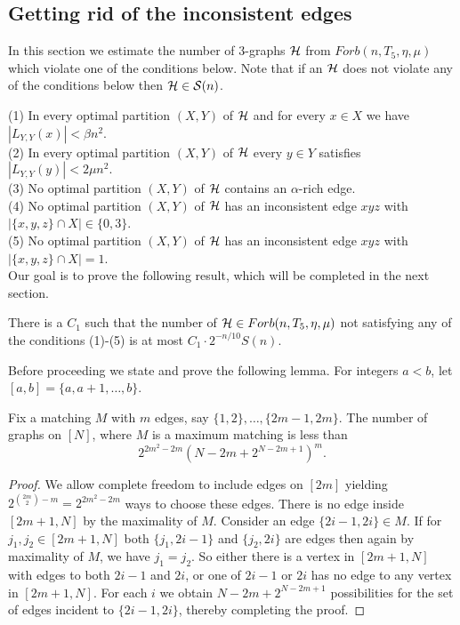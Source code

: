 \documentclass[11pt]{article}
\begin{document}
\subsection{Getting rid of the inconsistent edges}\label{secinconedges}



In this section  we estimate the number of $3$-graphs $\mathcal{H}$ from
$Forb(n,T_5,\eta,\mu)$ which violate one of the conditions below.
Note that if an $\mathcal{H}$ does not violate any of the conditions below
then $\mathcal{H}\in \mathcal{S}(n)$.


(1) In every optimal partition  $(X,Y)$ of $\mathcal{H}$ and for every
$x\in X$ we have $|L_{Y,Y}(x)|< \beta n^2$.\\
(2)  In every optimal partition  $(X,Y)$ of $\mathcal{H}$ every $y\in Y$
satisfies $|L_{Y,Y}(y)|<2\mu n^2.$   \\
 (3) No  optimal partition  $(X,Y)$ of $\mathcal{H}$ contains an $\alpha$-rich
edge.\\
(4) No optimal partition $(X,Y)$ of $\mathcal{H}$ has an inconsistent edge
 $xyz$ with $|\{x,y,z\} \cap X|\in\{0,3\}$.\\
(5) No optimal partition $(X,Y)$ of $\mathcal{H}$ has an inconsistent edge
 $xyz$ with $|\{x,y,z\} \cap X|=1$.
\\

Our goal is to prove the following result, which will be completed in the next section.

\begin{theorem}\label{badtriple}
There is a $C_1$ such that the number of $\mathcal{H}\in
 Forb(n,T_5,\eta,\mu)$ not satisfying any of the conditions (1)-(5) is at most  $C_1\cdot
 2^{-n/10}S(n)$.
\end{theorem}

Before proceeding we state and prove the following lemma.
For integers $a<b$, let $[a,b]=\{a, a+1, \ldots, b\}$.

\begin{lemma}\label{matchcount}
Fix a matching $M$ with $m$ edges, say $\{1,2\},\ldots, \{2m-1, 2m\}$. The
number of graphs on $[N]$,  where $M$ is a maximum matching is less
than $$2^{2m^2-2m} (N-2m + 2^{N-2m+1})^{m}.$$
\end{lemma}

\begin{proof} We allow complete freedom to include edges on $[2m]$ yielding $2^{\binom{2m}{2}-m}=
2^{2m^2-2m}$ ways to choose these edges.
There is no edge inside $[2m+1,N]$  by the maximality of $M$. Consider an edge $\{2i-1, 2i\} \in M$.  If for  $j_1,j_2\in [2m+1,N]$ both
$\{j_1,2i-1\}$ and $\{j_2, 2i\}$ are edges then again by maximality of $M$, we have $j_1=j_2$.  So either there is a vertex in $[2m+1, N]$
 with
edges to both  $2i-1$ and $2i$, or one of $2i-1$ or $2i$ has no edge to any vertex
 in $[2m+1,N]$. For each $i$ we obtain $N-2m + 2^{N-2m+1}$  possibilities for the set of edges incident to $\{2i-1,2i\}$,
  thereby completing the proof.
\end{proof}
\end{document}
